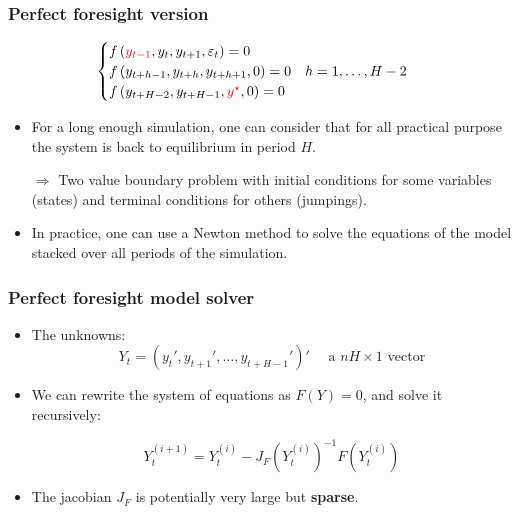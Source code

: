 \documentclass{beamer}
\begin{document}
\begin{frame}
  \frametitle{Perfect foresight version}

  \[
    \begin{cases}
      f\left( {\color{red}y_{t-1}},y_t,y_{t+1},\varepsilon_t \right) = 0\\
      f\left( y_{t+h-1},y_{t+h},y_{t+h+1}, 0 \right) = 0\quad h=1,\ldots,H-2\\
      f\left( y_{t+H-2},y_{t+H-1},{\color{red}y^{\star}}, 0 \right) = 0\\
    \end{cases}
  \]
  \bigskip

  \begin{itemize}

  \item For a long enough simulation, one can consider that for all
    practical purpose the system is back to equilibrium in period $H$.\newline

  \item[$\Rightarrow$] Two value boundary problem with
    initial conditions for some variables (states) and
    terminal conditions for others (jumpings).\newline

  \item In practice, one can use a Newton method to solve the equations of
    the model stacked over all periods of the simulation.\newline

  \end{itemize}

\end{frame}


\begin{frame}
  \frametitle{Perfect foresight model solver}

\begin{itemize}

    \item The unknowns:\newline
\[
    Y_t = (y_t', y_{t+1}',\ldots,y_{t+H-1}')' \quad\text{ a }nH\times 1\text{ vector}
  \]

   \bigskip

    \item We can rewrite the system of equations as $F(Y)=0$, and solve it recursively:\newline

\[
    Y_t^{(i+1)} = Y_t^{(i)} - J_F\left(Y_t^{(i)}\right)^{-1} F\left(Y_t^{(i)}\right)
  \]
\medskip

    \item The jacobian $J_F$ is potentially very large but \textbf{sparse}.

\end{itemize}

\end{frame}
\end{document}
